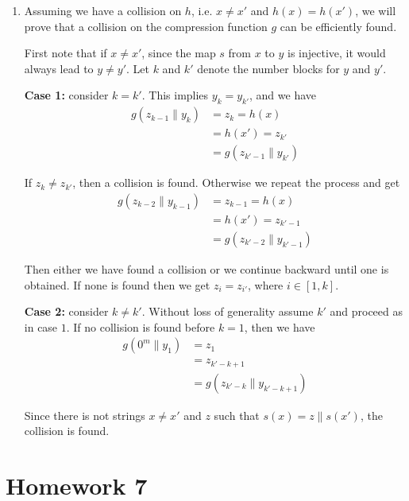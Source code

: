 \documentclass[11pt,a4paper]{article}
\begin{document}
\begin{enumerate}
\item Assuming we have a collision on $h$, i.e. $x \neq x'$ and $h(x) = h(x')$, we will prove that a collision on the compression function $g$ can be efficiently found.
\par First note that if $x \neq x'$, since the map $s$ from $x$ to $y$ is injective, it would always lead to $y \neq y'$. Let $k$ and $k'$ denote the number blocks for $y$ and $y'$.
\par \textbf{Case 1:} consider $k = k'$. This implies $y_{k} = y_{k'}$, and we have
	\begin{align*}
	g(z_{k-1}\|y_{k}) &= z_{k} = h(x) \\
	&= h(x') = z_{k'} \\
	&= g(z_{k'-1}\|y_{k'})
	\end{align*}
\par If $z_{k} \neq z_{k'}$, then a collision is found. Otherwise we repeat the process and get
	\begin{align*}
	g(z_{k-2}\|y_{k-1}) &= z_{k-1} = h(x) \\
	&= h(x') = z_{k'-1} \\
	&= g(z_{k'-2}\|y_{k'-1})
	\end{align*}
\par Then either we have found a collision or we continue backward until one is obtained. If none is found then we get $z_{i} = z_{i'}$, where $i \in [1, k]$.
\par \textbf{Case 2:} consider $k \neq k'$. Without loss of generality assume $k'$ and proceed as in case $1$. If no collision is found before $k = 1$, then we have
	\begin{align*}
	g(0^{m}\|y_{1}) &= z_{1} \\
	&= z_{k'-k+1} \\
	&= g(z_{k'-k}\|y_{k'-k+1})
	\end{align*}
\par Since there is not strings $x \neq x'$ and $z$ such that $s(x) = z \| s(x')$, the collision is found.
\end{enumerate}



\section*{Homework 7}
\end{document}
